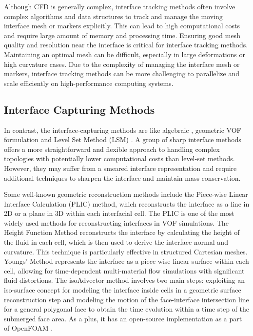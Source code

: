 Although CFD is generally complex, interface tracking methods often involve complex algorithms and data structures to track and manage the moving interface mesh or markers explicitly. This can lead to high computational costs and require large amount of memory and processing time.
Ensuring good mesh quality and resolution near the interface is critical for interface tracking methods. Maintaining an optimal mesh can be difficult, especially in large deformations or high curvature cases. Due to the complexity of managing the interface mesh or markers, interface tracking methods can be more challenging to parallelize and scale efficiently on high-performance computing systems.

\subsection{Interface Capturing Methods}

In contrast, the interface-capturing methods are like algebraic \cite{algebraicVOF}, geometric VOF \cite{roenby2019isoadvector} formulation and Level Set Method (LSM) \cite{VOF_level_set}. A group of sharp interface methods \cite{sharp-interface} offers a more straightforward and flexible approach to handling complex topologies with potentially lower computational costs than level-set methods. However, they may suffer from a smeared interface representation and require additional techniques to sharpen the interface and maintain mass conservation.

Some well-known geometric reconstruction methods include the Piece-wise Linear Interface Calculation (PLIC) \cite{huang2012piecewise} method, which reconstructs the interface as a line in 2D or a plane in 3D within each interfacial cell. The PLIC is one of the most widely used methods for reconstructing interfaces in VOF simulations. The Height Function Method \cite{height-function} reconstructs the interface by calculating the height of the fluid in each cell, which is then used to derive the interface normal and curvature. This technique is particularly effective in structured Cartesian meshes. Youngs' Method \cite{youngs-method} represents the interface as a piece-wise linear surface within each cell, allowing for time-dependent multi-material flow simulations with significant fluid distortions. The isoAdvector \cite{roenby2019isoadvector} method involves two main steps: exploiting an iso-surface concept for modeling the interface inside cells in a geometric surface reconstruction step and modeling the motion of the face-interface intersection line for a general polygonal face to obtain the time evolution within a time step of the submerged face area. As a plus, it has an open-source implementation as a part of OpenFOAM \cite{jasak2007openfoam}.

